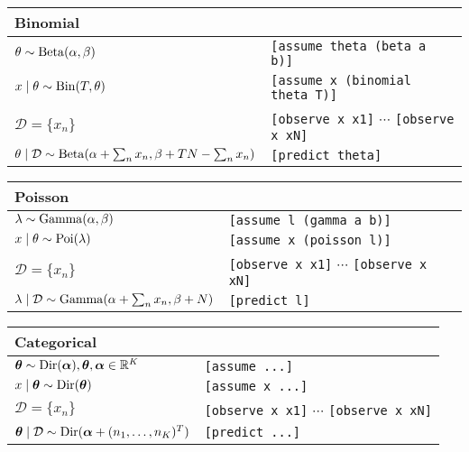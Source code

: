 \begin{table}[h]
\begin{tabular}{ll}
\toprule
Binomial & \\
\midrule
$\theta \sim \operatorname{Beta}(\alpha, \beta)$													& \texttt{[assume theta (beta a b)]} \\
$x \mid \theta \sim \operatorname{Bin}(T, \theta)$												& \texttt{[assume x (binomial theta T)]} \\
$\mathcal D = \{x_n\}$																& \texttt{[observe x x1]} $\cdots$ \texttt{[observe x xN]} \\
$\theta \mid \mathcal D \sim \operatorname{Beta}(\alpha + \sum_n x_n, \beta + TN - \sum_n x_n)$	& \texttt{[predict theta]} \\
\bottomrule
\end{tabular}
\end{table}

\begin{table}[h]
\begin{tabular}{ll}
\toprule
Poisson & \\
\midrule
$\lambda \sim \operatorname{Gamma}(\alpha, \beta)$											& \texttt{[assume l (gamma a b)]} \\
$x \mid \theta \sim \operatorname{Poi}(\lambda)$													& \texttt{[assume x (poisson l)]} \\
$\mathcal D = \{x_n\}$																& \texttt{[observe x x1]} $\cdots$ \texttt{[observe x xN]} \\
$\lambda \mid \mathcal D \sim \operatorname{Gamma}(\alpha + \sum_n x_n, \beta + N)$			& \texttt{[predict l]} \\
\bottomrule
\end{tabular}
\end{table}

\begin{table}[h]
\begin{tabular}{ll}
\toprule
Categorical & \\
\midrule
$\boldsymbol{\mathbf{\theta}} \sim \operatorname{Dir}(\boldsymbol{\mathbf{\alpha}}), \boldsymbol{\mathbf{\theta}},\boldsymbol{\mathbf{\alpha}} \in \mathbb R^K$			& \texttt{[assume ...]} \\
$x \mid \boldsymbol{\mathbf{\theta}} \sim \operatorname{Dir}(\boldsymbol{\mathbf{\theta}})$											& \texttt{[assume x ...]} \\
$\mathcal D = \{x_n\}$																& \texttt{[observe x x1]} $\cdots$ \texttt{[observe x xN]} \\
$\boldsymbol{\mathbf{\theta}} \mid \mathcal D \sim \operatorname{Dir}(\boldsymbol{\mathbf{\alpha}} + (n_1, \dotsc, n_K)^T)$			& \texttt{[predict ...]} \\
\bottomrule
\end{tabular}
\end{table}

